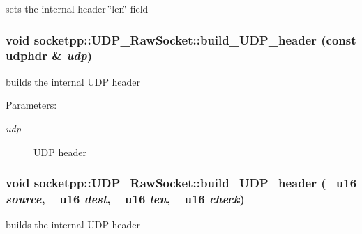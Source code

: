 sets the internal header \char`\"{}len\char`\"{} field 

\hypertarget{classsocketpp_1_1UDP__RawSocket_b194e3ab2f5b758dee8a0c715d895c1e}{
\subsubsection[{build\_\-UDP\_\-header}]{\setlength{\rightskip}{0pt plus 5cm}void socketpp::UDP\_\-RawSocket::build\_\-UDP\_\-header (const udphdr \& {\em udp})}}
\label{classsocketpp_1_1UDP__RawSocket_b194e3ab2f5b758dee8a0c715d895c1e}


builds the internal UDP header 

\begin{Desc}
\item[Parameters:]
\begin{description}
\item[{\em udp}]UDP header \end{description}
\end{Desc}
\hypertarget{classsocketpp_1_1UDP__RawSocket_f107901141295d21929008e281aac00f}{
\subsubsection[{build\_\-UDP\_\-header}]{\setlength{\rightskip}{0pt plus 5cm}void socketpp::UDP\_\-RawSocket::build\_\-UDP\_\-header ({\bf \_\-u16} {\em source}, \/  {\bf \_\-u16} {\em dest}, \/  {\bf \_\-u16} {\em len}, \/  {\bf \_\-u16} {\em check})}}
\label{classsocketpp_1_1UDP__RawSocket_f107901141295d21929008e281aac00f}


builds the internal UDP header 

